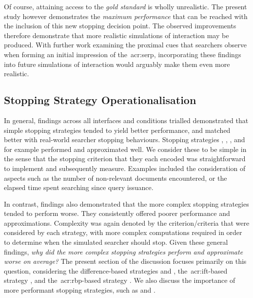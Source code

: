 Of course, attaining access to the \emph{gold standard} is wholly unrealistic. The present study however demonstrates the \emph{maximum performance} that can be reached with the inclusion of this new stopping decision point. The observed improvements therefore demonstrate that more realistic simulations of interaction may be produced. With further work examining the proximal cues that searchers observe when forming an initial impression of the~\gls{acr:serp}, incorporating these findings into future simulations of interaction would arguably make them even more realistic.

\subsection{Stopping Strategy Operationalisation}\label{sec:conclusions:discussion:strategies}
In general, findings across all interfaces and conditions trialled demonstrated that simple stopping strategies tended to yield better performance, and matched better with real-world searcher stopping behaviours. Stopping strategies , , ,  and  for example performed and approximated well. We consider these to be simple in the sense that the stopping criterion that they each encoded was straightforward to implement and subsequently measure. Examples included the consideration of aspects such as the number of non-relevant documents encountered, or the elapsed time spent searching since query issuance.

In contrast, findings also demonstrated that the more complex stopping strategies tended to perform worse. They consistently offered poorer performance and approximations. Complexity was again denoted by the criterion/criteria that were considered by each strategy, with more complex computations required in order to determine when the simulated searcher should stop. Given these general findings, \emph{why did the more complex stopping strategies perform and approximate worse on average?} The present section of the discussion focuses primarily on this question, considering the difference-based strategies  and , the~\gls{acr:ift}-based strategy , and the~\gls{acr:rbp}-based strategy . We also discuss the importance of more performant stopping strategies, such as  and .

